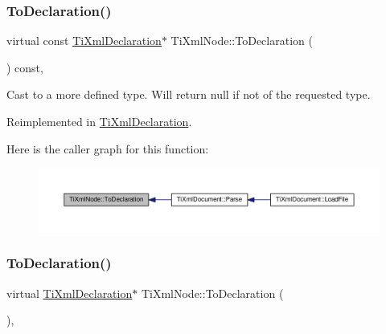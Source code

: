 \subsubsection{\texorpdfstring{To\+Declaration()}{ToDeclaration()}\hspace{0.1cm}{\footnotesize\ttfamily [1/2]}}
{\footnotesize\ttfamily virtual const \hyperlink{class_ti_xml_declaration}{Ti\+Xml\+Declaration}$\ast$ Ti\+Xml\+Node\+::\+To\+Declaration (\begin{DoxyParamCaption}{ }\end{DoxyParamCaption}) const\hspace{0.3cm}{\ttfamily [inline]}, {\ttfamily [virtual]}}



Cast to a more defined type. Will return null if not of the requested type. 



Reimplemented in \hyperlink{class_ti_xml_declaration_aab62703b620d9b9391b482dc1835ecf6}{Ti\+Xml\+Declaration}.

Here is the caller graph for this function\+:\nopagebreak
\begin{figure}[H]
\begin{center}
\leavevmode
\includegraphics[width=350pt]{class_ti_xml_node_a0dc0831e89d499ca911a3be61a413d45_icgraph}
\end{center}
\end{figure}
\mbox{\label{class_ti_xml_node_a4027136ca820ff4a636b607231b6a6df}} 
\subsubsection{\texorpdfstring{To\+Declaration()}{ToDeclaration()}\hspace{0.1cm}{\footnotesize\ttfamily [2/2]}}
{\footnotesize\ttfamily virtual \hyperlink{class_ti_xml_declaration}{Ti\+Xml\+Declaration}$\ast$ Ti\+Xml\+Node\+::\+To\+Declaration (\begin{DoxyParamCaption}{ }\end{DoxyParamCaption})\hspace{0.3cm}{\ttfamily [inline]}, {\ttfamily [virtual]}}




